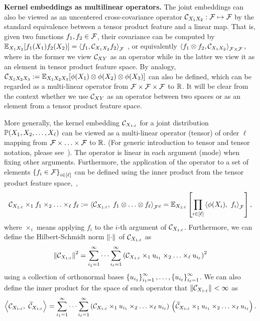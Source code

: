 \documentclass{article}
\begin{document}
{\bf Kernel embeddings as multilinear operators.}
The joint embeddings can also be viewed as an uncentered cross-covariance operator $\mathcal{C}_{X_1X_2}:\mathcal{F}\mapsto \mathcal{F}$ by the standard equivalence between a tensor product feature and a linear map.
That is, given two functions $f_1,f_2\in\mathcal{F}$, their covariance can be computed by
$
    \mathbb{E}_{X_1X_2}[f_1(X_1)f_2(X_2)]=\left\langle f_1,\mathcal{C}_{X_1X_2} f_2 \right\rangle_{\mathcal{F}}
$
, or equivalently
$
\left\langle f_1\otimes f_2,\mathcal{C}_{X_1X_2} \right\rangle_{\mathcal{F}\times\mathcal{F}},
$
where in the former we view $\mathcal{C}_{XY}$ as an operator while in the latter we view it as an element in tensor product feature space.
By analogy, $\mathcal{C}_{X_1X_2X_3} := \mathbb{E}_{X_1X_2X_3}[\phi(X_1)\otimes\phi(X_2)\otimes \phi(X_3)]$ can also be defined, which can be regarded as a multi-linear operator from $\mathcal{F}\times\mathcal{F}\times\mathcal{F}$ to $\mathbb{R}$.
It will be clear from the context whether we use $\mathcal{C}_{XY}$ as an operator between two spaces or as an element from a tensor product feature space.

More generally, the kernel embedding $\mathcal{C}_{X_{1:\ell}}$ for a joint distribution $\mathbb{P}(X_1,X_2,\ldots,X_{\ell})$ can be viewed as a multi-linear operator (tensor) of order $\ell$ mapping from $\mathcal{F}\times\ldots\times \mathcal{F}$ to $\mathbb{R}$. (For generic introduction to tensor and tensor notation, please see~\cite{KolBad09}). The operator is linear in each argument (mode) when fixing other arguments. Furthermore, the application of the operator to a set of elements $\left\{f_i \in \mathcal{F}\right\}_{i \in [\ell]}$ can be defined using the inner product from the tensor product feature space,~\ie,
\begin{align}
	\mathcal{C}_{X_{1:\ell}} \times_1 f_1 \times_2 \ldots \times_\ell f_\ell := 	\left\langle \mathcal{C}_{X_{1:\ell}},\;f_1\otimes\ldots\otimes f_\ell \right\rangle_{\mathcal{F}^d}=\mathbb{E}_{X_{1:\ell}}\left[\prod_{i \in [\ell]} \left\langle \phi(X_i),~f_i \right\rangle_{\mathcal{F}}\right],
\end{align}
where $\times_i$ means applying $f_i$ to the $i$-th argument of $\mathcal{C}_{X_{1:\ell}}$. Furthermore, we can define the Hilbert-Schmidt norm $\left\|\cdot\right\|_{}$ of $\mathcal{C}_{X_{1:\ell}}$ as
\[
 \left\|\mathcal{C}_{X_{1:\ell}}\right\|_{}^2 = \sum_{i_1 = 1}^\infty \cdots \sum_{i_\ell = 1}^\infty \left(\mathcal{C}_{X_{1:\ell}} \times_1 u_{i_1} \times_2 \ldots \times_\ell u_{i_\ell}\right)^2
\]
using a collection of orthonormal bases $\left\{u_{i_1}\right\}_{i_1=1}^\infty, \ldots, \left\{u_{i_\ell}\right\}_{i_\ell=1}^\infty$. We can also define the inner product for the space of such operator that $\left\|\mathcal{C}_{X_{1:\ell}}\right\|_{}<\infty$ as
\begin{align}
	\left\langle \mathcal{C}_{X_{1:\ell}},~\widetilde{\mathcal{C}}_{X_{1:\ell}} \right\rangle_{}  =  \sum_{i_1 = 1}^\infty \cdots \sum_{i_\ell = 1}^\infty \left(\mathcal{C}_{X_{1:\ell}} \times_1 u_{i_1} \times_2 \ldots \times_\ell u_{i_\ell}\right)\, \left(\widetilde{\mathcal{C}}_{X_{1:\ell}} \times_1 u_{i_1} \times_2 \ldots \times_\ell u_{i_\ell}\right).
\end{align}
\end{document}
